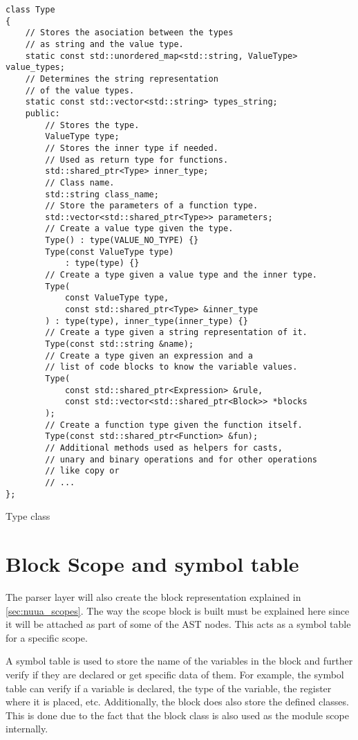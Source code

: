\begin{listing}[H]
\begin{verbatim}
class Type
{
    // Stores the asociation between the types
    // as string and the value type.
    static const std::unordered_map<std::string, ValueType> value_types;
    // Determines the string representation
    // of the value types.
    static const std::vector<std::string> types_string;
    public:
        // Stores the type.
        ValueType type;
        // Stores the inner type if needed.
        // Used as return type for functions.
        std::shared_ptr<Type> inner_type;
        // Class name.
        std::string class_name;
        // Store the parameters of a function type.
        std::vector<std::shared_ptr<Type>> parameters;
        // Create a value type given the type.
        Type() : type(VALUE_NO_TYPE) {}
        Type(const ValueType type)
            : type(type) {}
        // Create a type given a value type and the inner type.
        Type(
            const ValueType type,
            const std::shared_ptr<Type> &inner_type
        ) : type(type), inner_type(inner_type) {}
        // Create a type given a string representation of it.
        Type(const std::string &name);
        // Create a type given an expression and a
        // list of code blocks to know the variable values.
        Type(
            const std::shared_ptr<Expression> &rule,
            const std::vector<std::shared_ptr<Block>> *blocks
        );
        // Create a function type given the function itself.
        Type(const std::shared_ptr<Function> &fun);
        // Additional methods used as helpers for casts,
        // unary and binary operations and for other operations
        // like copy or
        // ...
};
\end{verbatim}
\caption{Type class}
\label{ls:type_class}
\end{listing}

\section{Block Scope and symbol table}

The parser layer will also create the block representation explained in \autoref{sec:nuua_scopes}. The way the scope block is built must be
explained here since it will be attached as part of some of the AST nodes. This acts as a symbol table for a specific scope.

A symbol table is used to store the name of the variables in the block and further verify if they are declared or get specific data of them.
For example, the symbol table can verify if a variable is declared, the type of the variable, the register where it is placed, etc.
Additionally, the block does also store the defined classes. This is done due to the fact that the block class is also used as the module scope internally.

